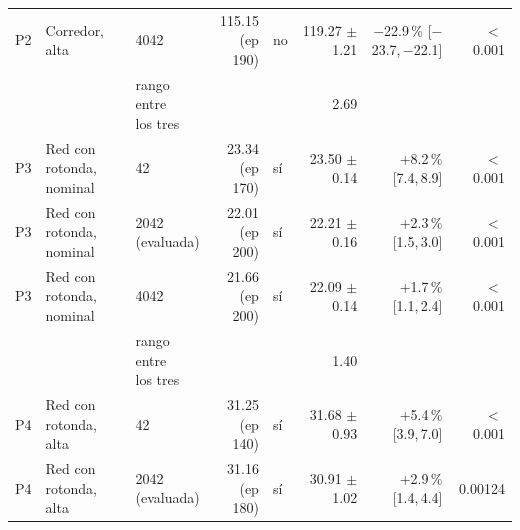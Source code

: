 \begin{table}[H]
\begin{tabular}{lllrlrrr}
P2 & \makecell[l]{Corredor,\\{}alta} & 4042 & \makecell[r]{115.15\\{}(ep 190)} & no & \makecell[r]{119.27\\{}$\pm$ 1.21} & \makecell[r]{$-$22.9\,\%\\{}[$-$23.7,\,$-$22.1]} & $<$\,0.001 \\
 & & \makecell[l]{rango entre\\{}los tres} & & & 2.69 & & \\
P3 & \makecell[l]{Red con rotonda,\\{}nominal} & 42 & \makecell[r]{23.34\\{}(ep 170)} & sí & \makecell[r]{23.50\\{}$\pm$ 0.14} & \makecell[r]{+8.2\,\%\\{}[7.4,\,8.9]} & $<$\,0.001 \\
P3 & \makecell[l]{Red con rotonda,\\{}nominal} & \makecell[l]{2042\\{}(evaluada)} & \makecell[r]{22.01\\{}(ep 200)} & sí & \makecell[r]{22.21\\{}$\pm$ 0.16} & \makecell[r]{+2.3\,\%\\{}[1.5,\,3.0]} & $<$\,0.001 \\
P3 & \makecell[l]{Red con rotonda,\\{}nominal} & 4042 & \makecell[r]{21.66\\{}(ep 200)} & sí & \makecell[r]{22.09\\{}$\pm$ 0.14} & \makecell[r]{+1.7\,\%\\{}[1.1,\,2.4]} & $<$\,0.001 \\
 & & \makecell[l]{rango entre\\{}los tres} & & & 1.40 & & \\
P4 & \makecell[l]{Red con rotonda,\\{}alta} & 42 & \makecell[r]{31.25\\{}(ep 140)} & sí & \makecell[r]{31.68\\{}$\pm$ 0.93} & \makecell[r]{+5.4\,\%\\{}[3.9,\,7.0]} & $<$\,0.001 \\
P4 & \makecell[l]{Red con rotonda,\\{}alta} & \makecell[l]{2042\\{}(evaluada)} & \makecell[r]{31.16\\{}(ep 180)} & sí & \makecell[r]{30.91\\{}$\pm$ 1.02} & \makecell[r]{+2.9\,\%\\{}[1.4,\,4.4]} & 0.00124 \\

\end{tabular}
\end{table}
